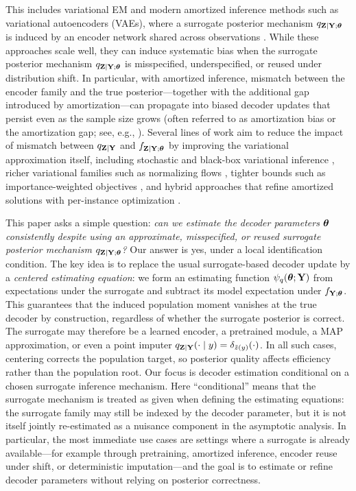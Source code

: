 \documentclass[twoside,11pt]{article}
\begin{document}
This includes variational EM and modern amortized inference methods such as variational autoencoders (VAEs), where a surrogate posterior mechanism $q_{{\bf Z}\mid{\bf Y};{\bm{\theta}}}$ is induced by an encoder network shared across observations \citep{dempster1977maximum,jordan1999introduction,kingma2014autoencoding,blei2017variational}.
While these approaches scale well, they can induce systematic bias when the surrogate posterior mechanism $q_{{\bf Z}\mid{\bf Y};{\bm{\theta}}}$ is misspecified, underspecified, or reused under distribution shift.
In particular, with amortized inference, mismatch between the encoder family and the true posterior---together with the additional gap introduced by amortization---can propagate into biased decoder updates that persist even as the sample size grows (often referred to as amortization bias or the amortization gap; see, e.g., \citealp{cremer2018inference}).
Several lines of work aim to reduce the impact of mismatch between $q_{{\bf Z}\mid{\bf Y}}$ and $f_{{\bf Z}\mid{\bf Y};{\bm{\theta}}}$ by improving the variational approximation itself, including stochastic and black-box variational inference \citep{hoffman2013svi,ranganath2014bbvi}, richer variational families such as normalizing flows \citep{rezende2015flows}, tighter bounds such as importance-weighted objectives \citep{burda2016iwae}, and hybrid approaches that refine amortized solutions with per-instance optimization \citep{kim2018semiamortized}.

This paper asks a simple question:
\emph{can we estimate the decoder parameters ${\bm{\theta}}$ consistently despite using an approximate, misspecified, or reused surrogate posterior mechanism $q_{{\bf Z}\mid{\bf Y};{\bm{\theta}}}$?}
Our answer is yes, under a local identification condition. The key idea is to replace the usual surrogate-based decoder update by a \emph{centered estimating equation}: we form an estimating function $\psi_q({\bm{\theta}};{\bf Y})$ from expectations under the surrogate and subtract its model expectation under $f_{{\bf Y};{\bm{\theta}}}$. This guarantees that the induced population moment vanishes at the true decoder by construction, regardless of whether the surrogate posterior is correct. The surrogate may therefore be a learned encoder, a pretrained module, a MAP approximation, or even a point imputer $q_{{\bf Z}\mid{\bf Y}}(\cdot\mid y)=\delta_{\tilde z(y)}(\cdot)$. In all such cases, centering corrects the population target, so posterior quality affects efficiency rather than the population root. Our focus is decoder estimation conditional on a chosen surrogate inference mechanism. Here ``conditional'' means that the surrogate mechanism is treated as given when defining the estimating equations: the surrogate family may still be indexed by the decoder parameter, but it is not itself jointly re-estimated as a nuisance component in the asymptotic analysis. In particular, the most immediate use cases are settings where a surrogate is already available---for example through pretraining, amortized inference, encoder reuse under shift, or deterministic imputation---and the goal is to estimate or refine decoder parameters without relying on posterior correctness.
\end{document}
